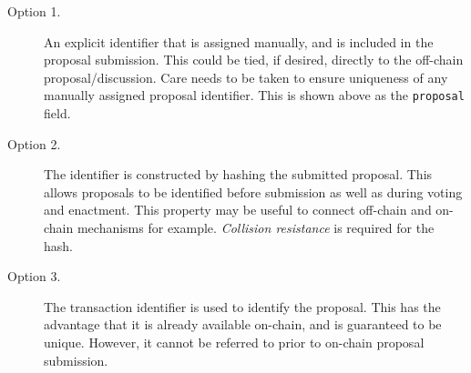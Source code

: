 \begin{description}
\item
  [Option 1.]
  An explicit identifier that is assigned manually, and is included in the proposal submission.  This could be tied, if desired, directly to the off-chain proposal/discussion.
  Care needs to be taken to ensure uniqueness of any manually assigned proposal identifier.  This is shown above as the \texttt{proposal} field.
\item
  [Option 2.]
  The identifier is constructed by hashing the submitted proposal.  This allows proposals to be identified before submission as well as during voting and enactment.  This property may be
  useful to connect off-chain and on-chain mechanisms for example.  \emph{Collision resistance} is required for the hash. 
\item
  [Option 3.]
  The transaction identifier is used to identify the proposal.  This has the advantage that it is already available on-chain, and is guaranteed to be unique.  However, it cannot be
  referred to prior to on-chain proposal submission.
\end{description}
